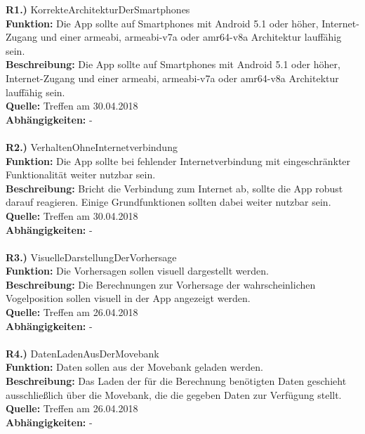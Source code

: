 \documentclass{article}
\begin{document}
\textbf{R1.)} KorrekteArchitekturDerSmartphones \\
\textbf{Funktion:} Die App sollte auf Smartphones mit Android 5.1 oder höher, Internet-Zugang und einer armeabi, armeabi-v7a oder amr64-v8a Architektur lauffähig sein. \\
\textbf{Beschreibung:} Die App sollte auf Smartphones mit Android 5.1 oder höher, Internet-Zugang und einer armeabi, armeabi-v7a oder amr64-v8a Architektur lauffähig sein. \\
\textbf{Quelle:} Treffen am 30.04.2018 \\
\textbf{Abhängigkeiten:} - \\\\


\textbf{R2.)} VerhaltenOhneInternetverbindung \\
\textbf{Funktion:} Die App sollte bei fehlender Internetverbindung mit eingeschränkter Funktionalität weiter nutzbar sein. \\
\textbf{Beschreibung:} Bricht die Verbindung zum Internet ab, sollte die App robust darauf reagieren. Einige Grundfunktionen sollten dabei weiter nutzbar sein. \\
\textbf{Quelle:} Treffen am 30.04.2018 \\
\textbf{Abhängigkeiten:} - \\\\


\textbf{R3.)} VisuelleDarstellungDerVorhersage \\
\textbf{Funktion:} Die Vorhersagen sollen visuell dargestellt werden. \\
\textbf{Beschreibung:} Die Berechnungen zur Vorhersage der wahrscheinlichen Vogelposition sollen visuell in der App angezeigt werden. \\
\textbf{Quelle:} Treffen am 26.04.2018 \\
\textbf{Abhängigkeiten:} - \\\\


\textbf{R4.)} DatenLadenAusDerMovebank \\
\textbf{Funktion:} Daten sollen aus der Movebank geladen werden. \\
\textbf{Beschreibung:} Das Laden der für die Berechnung benötigten Daten geschieht ausschließlich über die Movebank, die die gegeben Daten zur Verfügung stellt. \\
\textbf{Quelle:} Treffen am 26.04.2018 \\
\textbf{Abhängigkeiten:} - \\\\
\end{document}
